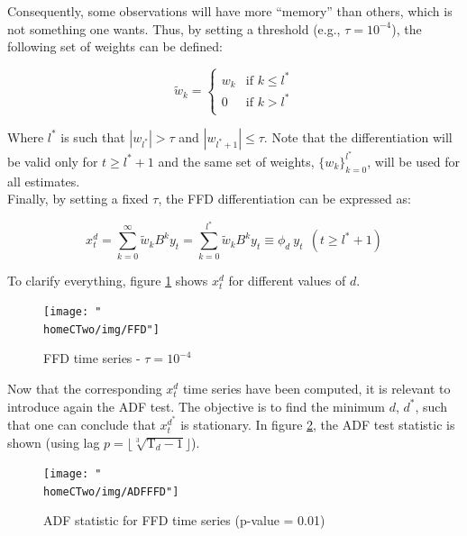 \documentclass[a4paper]{article}
\newcommand{\homeCTwo}{../../Chapter 2 - FracDiff/Draft}
\begin{document}
Consequently, some observations will have more ``memory'' than others, which 
is not something one wants. Thus, by setting a threshold
(e.g., $\tau = 10^{-4}$), the following set of weights can be defined:

\begin{equation*}
	\tilde{w}_k =
	\begin{cases}	 
		w_k & \text{if } k \leq l^*\\
		0 & \text{if } k > l^*\\
	\end{cases}
\end{equation*}

Where $l^*$ is such that $|w_{l^*}| > \tau$ and $|w_{l^* + 1}| \leq \tau$. 
Note that the differentiation will be valid only for $t \geq l^* + 1$ and 
the same set of weights, $\{w_{k}\}_{k = 0}^{l^*}$, will be used for all 
estimates.\\

Finally, by setting a fixed $\tau$, the FFD differentiation can be 
expressed as:

\begin{equation}
	\label{eqn:FFD}
	x_t^d = \sum_{k = 0}^{\infty} \tilde{w}_k B^k y_t = \sum_{k = 0}^{l^*} 
	\tilde{w}_k B^k y_t \equiv \phi_d \ y_t \ \ (t \geq l^* + 1)
\end{equation}

To clarify everything, figure \ref{fig:FFD} shows $x_t^d$ for different 
values of $d$.\\

\begin{figure}[htbp]
\centering
	\texttt{[image: "\\homeCTwo/img/FFD"]}
	\caption{FFD time series - $\tau = 10^{-4}$}
	\label{fig:FFD}
\end{figure}

Now that the corresponding $x_t^d$ time series have been computed, it is 
relevant to introduce again the ADF test. The objective is to find the 
minimum $d$, $d^*$, such that one can conclude that $x_t^{d^*}$ is 
stationary. In figure \ref{fig:ADFFFD}, the ADF test statistic is shown 
(using lag $p = \lfloor \sqrt[3]{\text{T}_d - 1} \rfloor$).\\

\begin{figure}[htbp]
\centering
	\texttt{[image: "\\homeCTwo/img/ADFFFD"]}
	\caption{ADF statistic for FFD time series (p-value = 0.01)}
	\label{fig:ADFFFD}
\end{figure}
\end{document}
